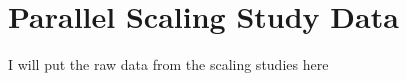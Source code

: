 \chapter{Parallel Scaling Study Data\ }
\label{chap:scaling_study_data}

I will put the raw data from the scaling studies here
